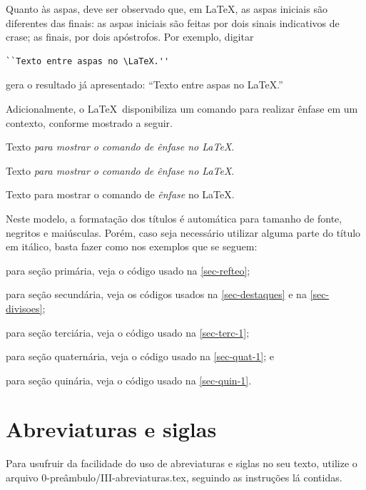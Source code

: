 Quanto às aspas, deve ser observado que, em \LaTeX, as aspas iniciais são diferentes das
finais: as aspas iniciais são feitas por dois sinais indicativos de crase; as finais, por dois apóstrofos. Por exemplo, digitar
\begin{verbatim}
``Texto entre aspas no \LaTeX.''
\end{verbatim}
gera o resultado já apresentado: ``Texto entre aspas no \LaTeX.''

Adicionalmente, o \LaTeX\ disponibiliza um comando para realizar ênfase em um contexto, conforme mostrado a seguir.


Texto \textit{para mostrar o comando de ênfase no \LaTeX}.

Texto \textit{para mostrar o comando de \emph{ênfase} no \LaTeX}.

Texto para mostrar o comando de \emph{ênfase} no \LaTeX.

Neste modelo, a formatação dos títulos é automática para tamanho de fonte, negritos e maiúsculas. Porém, caso seja necessário utilizar alguma parte do título em itálico, basta fazer como nos exemplos que se seguem:

\begin{alineas}
    \item para seção primária, veja o código usado na \autoref{sec-refteo};
    \item para seção secundária, veja os códigos usados na \autoref{sec-destaques} e na \autoref{sec-divisoes};
    \item para seção terciária, veja o código usado na \autoref{sec-terc-1};
    \item para seção quaternária, veja o código usado na \autoref{sec-quat-1}; e
    \item para seção quinária, veja o código usado na \autoref{sec-quin-1}.
\end{alineas}

\section{Abreviaturas e siglas}\label{sec-siglas}

Para usufruir da facilidade do uso de abreviaturas e siglas no seu texto, utilize o arquivo \textsf{0-preâmbulo/III-abreviaturas.tex}, seguindo as instruções lá contidas.

